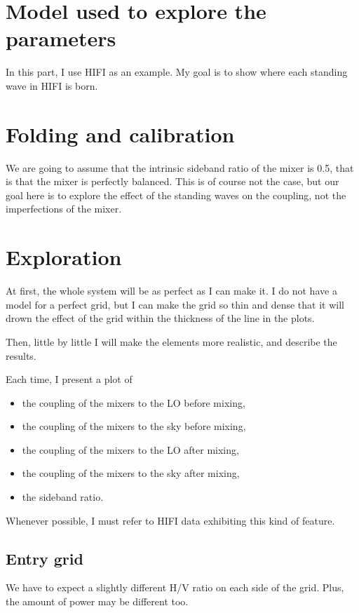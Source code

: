 \section{Model used to explore the parameters}
In this part, I use HIFI as an example.
My goal is to show where each standing wave in HIFI is born.

\section{Folding and calibration}

We are going to assume that the intrinsic sideband ratio of the mixer is 0.5, that is that the mixer is perfectly balanced.  This is of course not the case, but our goal here is to explore the effect of the standing waves on the coupling, not the imperfections of the mixer.

\section{Exploration}

At first, the whole system will be as perfect as I can make it.  I do not have a model for a perfect grid, but I can make the grid so thin and dense that it will drown the effect of the grid within the thickness of the line in the plots.

Then, little by little I will make the elements more realistic, and describe the results.

Each time, I present a plot of
\begin{itemize}
    \item the coupling of the mixers to the LO before mixing,
    \item the coupling of the mixers to the sky before mixing,
    \item the coupling of the mixers to the LO after mixing,
    \item the coupling of the mixers to the sky after mixing,
    \item the sideband ratio.
\end{itemize}
Whenever possible, I must refer to HIFI data exhibiting this kind of feature.

\subsection{Entry grid}
We have to expect a slightly different H/V ratio on each side of the grid.
Plus, the amount of power may be different too.


